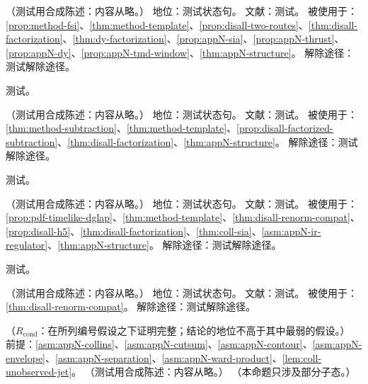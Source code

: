 \begin{assumption}\label{asm:appN-cutsum}
（测试用合成陈述：内容从略。）
地位：测试状态句。
文献：测试。
被使用于：\cref{prop:method-fsi}、\cref{thm:method-template}、\cref{prop:disall-two-routes}、\cref{thm:disall-factorization}、\cref{thm:dy-factorization}、\cref{prop:appN-sia}、\cref{prop:appN-thrust}、\cref{prop:appN-dy}、\cref{prop:appN-tmd-window}、\cref{thm:appN-structure}。
解除途径：测试解除途径。
\end{assumption}
\begin{proofsketch}测试。\end{proofsketch}

\begin{assumption}\label{asm:appN-uv}
（测试用合成陈述：内容从略。）
地位：测试状态句。
文献：测试。
被使用于：\cref{thm:method-subtraction}、\cref{thm:method-template}、\cref{prop:disall-factorized-subtraction}、\cref{thm:disall-factorization}、\cref{thm:appN-structure}。
解除途径：测试解除途径。
\end{assumption}
\begin{proofsketch}测试。\end{proofsketch}

\begin{assumption}\label{asm:appN-multren}
（测试用合成陈述：内容从略。）
地位：测试状态句。
文献：测试。
被使用于：\cref{prop:pdf-timelike-dglap}、\cref{thm:method-template}、\cref{thm:disall-renorm-compat}、\cref{prop:disall-h5}、\cref{thm:disall-factorization}、\cref{thm:coll-sia}、\cref{asm:appN-ir-regulator}、\cref{thm:appN-structure}。
解除途径：测试解除途径。
\end{assumption}
\begin{proofsketch}测试。\end{proofsketch}

\begin{assumption}\label{asm:appN-ir-regulator}
（测试用合成陈述：内容从略。）
地位：测试状态句。
文献：测试。
被使用于：\cref{thm:disall-renorm-compat}。
解除途径：测试解除途径。
\end{assumption}

\begin{proposition}\label{prop:appN-sia}
（$R_{\mathrm{cond}}$：在所列编号假设之下证明完整；结论的地位不高于其中最弱的假设。）
前提：\cref{asm:appN-collins}、\cref{asm:appN-cutsum}、\cref{asm:appN-contour}、\cref{asm:appN-envelope}、\cref{asm:appN-separation}、\cref{asm:appN-ward-product}、\cref{lem:coll-unobserved-jet}。
（测试用合成陈述：内容从略。）
（本命题只涉及部分子态。）
\end{proposition}

